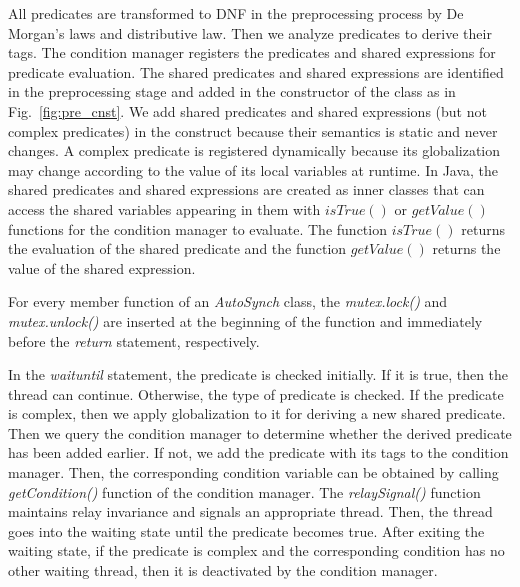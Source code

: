 \documentclass[preprint]{sigplanconf}
\begin{document}
All predicates are transformed to DNF in the preprocessing process by De Morgan's laws and 
distributive law. Then we analyze predicates to derive their tags. The condition 
manager registers the predicates and shared expressions for predicate 
evaluation. 
The shared 
predicates and shared expressions are identified in the preprocessing stage and added 
in the constructor of the class as in Fig.~\ref{fig:pre_cnst}. We add shared
predicates and shared expressions (but not complex predicates) in the construct because their semantics is
static and never changes. A complex predicate is registered dynamically
because its globalization may change according to the value of its local variables at
runtime. In Java, the shared 
predicates and shared expressions are created as inner classes that can access
the shared variables appearing in them with
$isTrue()$ or $getValue()$ functions for the condition manager to evaluate.
The function $isTrue()$ returns the evaluation of the shared predicate and
the function $getValue()$ returns the value of the shared expression.


For every member function of an {\em AutoSynch} class, the {\em mutex.lock()} and
{\em mutex.unlock()} are inserted at the beginning of the function and immediately before
the {\em return} statement, respectively.
%  


In the {\em waituntil} statement, the predicate is checked initially. If 
it is true, then the thread can continue. Otherwise, the type of
predicate is checked. If the predicate is complex, then we apply globalization 
to it for deriving a new shared predicate. Then we query the condition manager 
to determine
whether the derived predicate has been added earlier. If not, we add the 
predicate with its tags to the condition manager. Then, the corresponding 
condition variable can be obtained by calling {\em getCondition()} function of the
condition manager. The {\em relaySignal()} function maintains relay invariance 
and signals an appropriate thread. Then, the thread goes into the waiting state 
until the predicate becomes true. After exiting the waiting state, if the 
predicate is complex and the corresponding condition has no other 
waiting thread, then it is deactivated by the condition manager.
\end{document}
